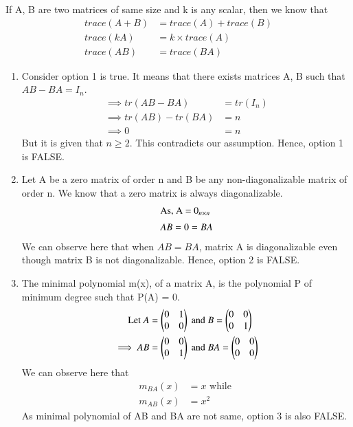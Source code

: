 If A, B are two matrices of same size and k is any scalar, then we know that 
\begin{align}
    trace(A+B) &= trace(A) + trace(B)\\
    trace(kA) &= k \times trace(A) \\
    trace(AB) &= trace(BA)
\end{align}
\begin{enumerate}
    \item Consider option 1 is true. It means that there exists matrices A, B such that $AB - BA = I_n$.
    \begin{align}
        \implies tr(AB - BA) &= tr(I_n) \\
        \implies tr(AB) - tr(BA) &= n \\
        \implies 0 &= n
    \end{align}
    But it is given that $n \geq 2$. This contradicts our assumption. Hence, option 1 is FALSE. 
    
    \item   Let A be a zero matrix of order n and B be any non-diagonalizable matrix of order n. We know that a zero matrix is always diagonalizable. 
    \begin{align}
        \intertext{As, A = $0_{ n\times n }$}
        AB = 0 = BA 
    \end{align}
    We can observe here that when $AB = BA$, matrix A is diagonalizable even though matrix B is not diagonalizable. Hence, option 2 is FALSE.
    
    \item The minimal polynomial m(x), of a matrix A, is the polynomial P of minimum degree such that P(A) = 0.
    \begin{align}
        \text{Let } A &= \begin{pmatrix}0 & 1 \\ 0 & 0\end{pmatrix} \text{ and } B = \begin{pmatrix}0 & 0 \\ 0 & 1\end{pmatrix} \\
        \implies AB &= \begin{pmatrix}0 & 0 \\ 0 & 1\end{pmatrix} \text{ and } BA = \begin{pmatrix}0 & 0 \\ 0 & 0\end{pmatrix}
    \end{align}
    We can observe here that 
    \begin{align}
        m_{BA}(x) &= x \text{ while } \\
        m_{AB}(x) &= x^2
    \end{align}
    As minimal polynomial of AB and BA are not same, option 3 is also FALSE. 
    

\end{enumerate}

